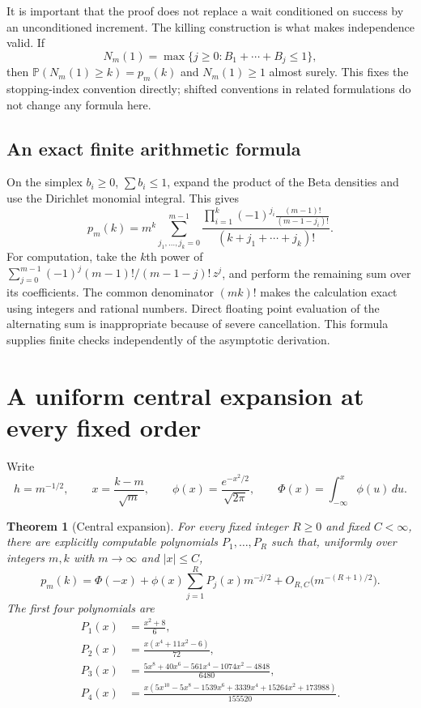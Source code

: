 \documentclass[11pt]{article}
\numberwithin{equation}{section}
\newtheorem{theorem}{Theorem}[section]
\theoremstyle{remark}\newtheorem{remark}[theorem]{Remark}
\newcommand{\Prob}{\mathbb P}\newcommand{\E}{\mathbb E}\newcommand{\He}{\operatorname{He}}
\begin{document}
It is important that the proof does not replace a wait conditioned on
success by an unconditioned increment.  The killing construction is what
makes independence valid.  If
\[
 N_m(1)=\max\{j\geq0:B_1+\cdots+B_j\leq1\},
\]
then $\Prob(N_m(1)\geq k)=p_m(k)$ and $N_m(1)\geq1$ almost surely.
This fixes the stopping-index convention directly; shifted conventions
in related formulations do not change any formula here.

\subsection{An exact finite arithmetic formula}

On the simplex $b_i\geq0$, $\sum b_i\leq1$, expand the product of the Beta
densities and use the Dirichlet monomial integral.  This gives
\begin{equation}\label{brs:eq:exactsum}
 p_m(k)=m^k\!\sum_{j_1,\ldots,j_k=0}^{m-1}
 \frac{\displaystyle\prod_{i=1}^k
 (-1)^{j_i}\frac{(m-1)!}{(m-1-j_i)!}}
 {(k+j_1+\cdots+j_k)!}.
\end{equation}
For computation, take the $k$th power of
$\sum_{j=0}^{m-1}(-1)^j(m-1)!/(m-1-j)!\,z^j$, and perform the remaining
sum over its coefficients.  The common denominator $(mk)!$ makes the
calculation exact using integers and rational numbers.  Direct floating
point evaluation of the alternating sum is inappropriate because of
severe cancellation.  This formula supplies finite checks independently
of the asymptotic derivation.

\section{A uniform central expansion at every fixed order}\label{brs:sec:central}

Write
\[
 h=m^{-1/2},\qquad x=\frac{k-m}{\sqrt m},\qquad
 \phi(x)=\frac{e^{-x^2/2}}{\sqrt{2\pi}},\qquad
 \Phi(x)=\int_{-\infty}^x\phi(u)\,du.
\]

\begin{theorem}[Central expansion]\label{brs:thm:central}
For every fixed integer $R\geq0$ and fixed $C<\infty$, there are explicitly
computable polynomials $P_1,\ldots,P_R$ such that, uniformly over integers
$m,k$ with $m\to\infty$ and $|x|\leq C$,
\begin{equation}\label{brs:eq:central}
 p_m(k)=\Phi(-x)+\phi(x)\sum_{j=1}^R P_j(x)m^{-j/2}
       +O_{R,C}\bigl(m^{-(R+1)/2}\bigr).
\end{equation}
The first four polynomials are
\begin{align}
 P_1(x)&=\frac{x^2+8}{6},\label{brs:eq:p1}\\
 P_2(x)&=\frac{x(x^4+11x^2-6)}{72},\\
 P_3(x)&=\frac{5x^8+40x^6-561x^4-1074x^2-4848}{6480},\\
 P_4(x)&=\frac{x(5x^{10}-5x^8-1539x^6+3339x^4+15264x^2+173988)}{155520}.
\end{align}
\end{theorem}
\end{document}
